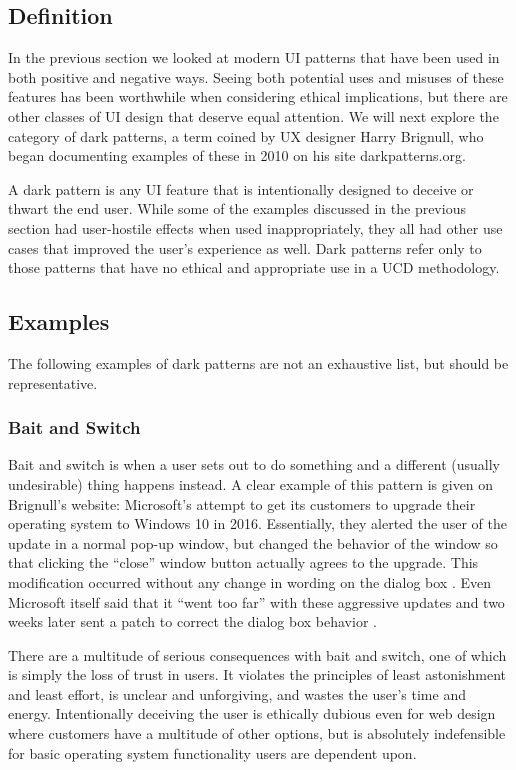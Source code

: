 \documentclass[12pt, oneside]{article}
\begin{document}
\subsection{Definition}

In the previous section we looked at modern UI patterns that have been used in both positive and negative ways. Seeing both potential uses and misuses of these features has been worthwhile when considering ethical implications, but there are other classes of UI design that deserve equal attention. We will next explore the category of dark patterns, a term coined by UX designer Harry Brignull, who began documenting examples of these in 2010 on his site darkpatterns.org.

A dark pattern is any UI feature that is intentionally designed to deceive or thwart the end user. While some of the examples discussed in the previous section had user-hostile effects when used inappropriately, they all had other use cases that improved the user's experience as well. Dark patterns refer only to those patterns that have no ethical and appropriate use in a UCD methodology.

\subsection{Examples}

The following examples of dark patterns are not an exhaustive list, but should be representative.

\subsubsection{Bait and Switch}

Bait and switch is when a user sets out to do something and a different (usually undesirable) thing happens instead. A clear example of this pattern is given on Brignull's website: Microsoft's attempt to get its customers to upgrade their operating system to Windows 10 in 2016. Essentially, they alerted the user of the update in a normal pop-up window, but changed the behavior of the window so that clicking the ``close'' window button actually agrees to the upgrade. This modification occurred without any change in wording on the dialog box \cite{thurrott_2016}. Even Microsoft itself said that it ``went too far'' with these aggressive updates and two weeks later sent a patch to correct the dialog box behavior \cite{popa_2016}.

There are a multitude of serious consequences with bait and switch, one of which is
simply the loss of trust in users. It violates the principles of least astonishment and least effort, is
unclear and unforgiving, and wastes the user's time and energy. Intentionally deceiving the user
is ethically dubious even for web design where customers have a multitude of other options, but
is absolutely indefensible for basic operating system functionality users are dependent upon.
\end{document}
